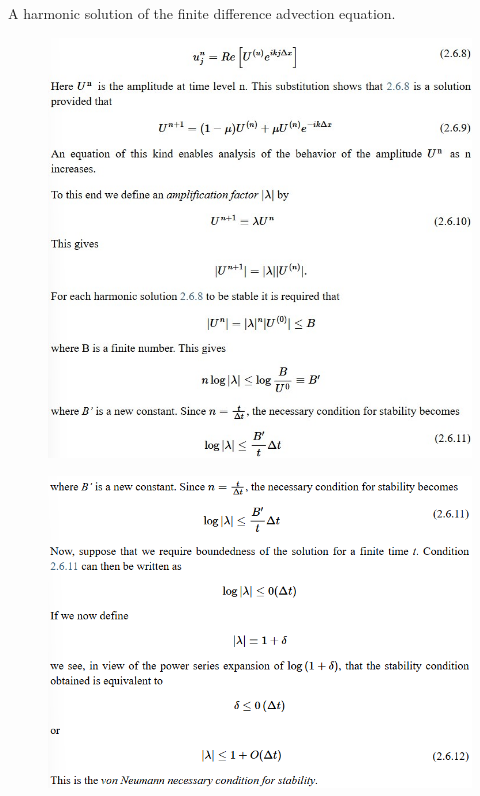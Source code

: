 A harmonic  solution of the finite difference advection equation.
\begin{figure}[htp!]
	\centering
	\includegraphics[width=0.65\linewidth]{uploads/Immagine 2024-12-07 103148.jpg}
\end{figure}
\begin{figure}[htp!]
	\centering
	\includegraphics[width=0.65\linewidth]{uploads/hhhhh.png}
\end{figure}

